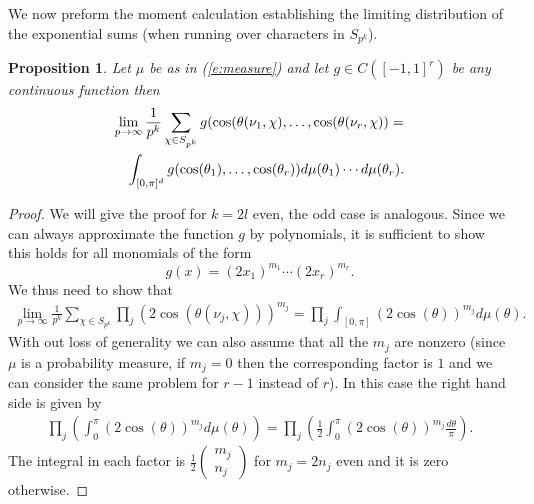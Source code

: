 \documentclass[12pt]{amsart}
\newtheorem{prop}[lem]{Proposition}
\theoremstyle{definition}
\theoremstyle{remark}
\numberwithin{equation}{section}
\begin{document}
We now preform the moment calculation establishing the limiting
distribution of the exponential sums (when running over characters
in $S_{p^k}$).
\begin{prop}\label{p:equi}
Let $\mu$ be as in (\ref{e:measure}) and let $g\in C([-1,1]^r)$ be
any continuous function then
\begin{eqnarray*}
\lefteqn{\lim_{p\to\infty}\frac{1}{p^k}\sum_{\chi\in S_{p^k}}g(\cos(\theta(\nu_1,\chi),\ldots,\cos(\theta(\nu_r,\chi))=}\\
&&\int_{[0,\pi]^d}g(\cos(\theta_1),\ldots,\cos(\theta_r))d\mu(\theta_1)\cdots
d\mu(\theta_r).
\end{eqnarray*}
\end{prop}
\begin{proof}
We will give the proof for $k=2l$ even, the odd case is analogous.
Since we can always approximate the function $g$ by polynomials, it
is sufficient to show this holds for all monomials of the form
$$g(x)=(2x_1)^{m_1}\cdots (2x_r)^{m_r}.$$
We thus need to show that
\begin{eqnarray*}
\lim_{p\to\infty}\frac{1}{p^k}\sum_{\chi\in
S_{p^k}}\prod_j(2\cos(\theta(\nu_j,\chi)))^{m_j}=\prod_{j}\int_{[0,\pi]}(2\cos(\theta))^{m_j}d\mu(\theta).
\end{eqnarray*}
With out loss of generality we can also assume that all the $m_j$
are nonzero (since $\mu$ is a probability measure, if $m_j=0$ then
the corresponding factor is $1$ and we can consider the same problem
for $r-1$ instead of $r$). In this case the right hand side is given
by
\begin{eqnarray*}
 \prod_j\left(\int_0^\pi \left(2\cos(\theta)\right)^{m_j}d\mu(\theta)\right)=\prod_j\left(\frac{1}{2}\int_0^\pi \left(2\cos(\theta)\right)^{m_j}\frac{d\theta}{\pi}\right).
\end{eqnarray*}
The integral in each factor is
$\frac{1}{2}\begin{pmatrix}m_j\\n_j\end{pmatrix}$ for $m_j=2n_j$
even and it is zero otherwise.


\end{proof}
\end{document}
